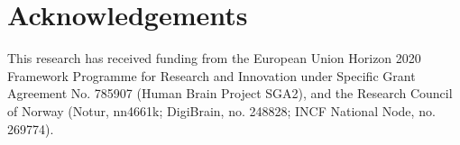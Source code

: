 \documentclass[preprint,11pt,authoryear]{elsarticle}
\begin{document}

\section*{Acknowledgements}
\label{sec:acknowledgements}
This research has received funding from the European Union Horizon 2020 Framework Programme for Research
and Innovation under Specific Grant Agreement No. 785907 (Human Brain Project SGA2), and the Research Council of Norway (Notur, nn4661k; DigiBrain, no. 248828; INCF National Node, no. 269774).




\label{sec:bibliography}


\end{document}
